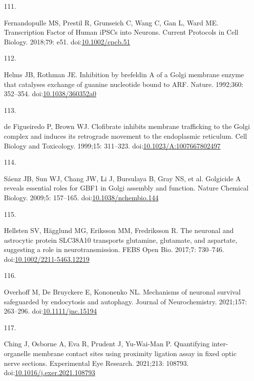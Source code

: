 \documentclass[
  12pt,
  a4paper,
]{book}
\newlength{\cslhangindent}
\newlength{\csllabelwidth}
\newlength{\cslentryspacingunit} %
\newenvironment{CSLReferences}[2] %
 {%
  \setlength{\parindent}{0pt}
  \ifodd #1
  \let\oldpar\par
  \def\par{\hangindent=\cslhangindent\oldpar}
  \fi
  \setlength{\parskip}{#2\cslentryspacingunit}
 }%
 {}
\newcommand{\CSLLeftMargin}[1]{\parbox[t]{\csllabelwidth}{#1}}
\newcommand{\CSLRightInline}[1]{\parbox[t]{\linewidth - \csllabelwidth}{#1}\break}
\begin{document}
\begin{CSLReferences}{0}{0}
\leavevmode{}%
\CSLLeftMargin{111. }%
\CSLRightInline{Fernandopulle MS, Prestil R, Grunseich C, Wang C, Gan L, Ward ME. Transcription {Factor}\textendash{{Mediated Differentiation}} of {Human iPSCs} into {Neurons}. Current Protocols in Cell Biology. 2018;79: e51. doi:\href{https://doi.org/10.1002/cpcb.51}{10.1002/cpcb.51}}

\leavevmode{}%
\CSLLeftMargin{112. }%
\CSLRightInline{Helms JB, Rothman JE. Inhibition by brefeldin {A} of a {Golgi} membrane enzyme that catalyses exchange of guanine nucleotide bound to {ARF}. Nature. 1992;360: 352--354. doi:\href{https://doi.org/10.1038/360352a0}{10.1038/360352a0}}

\leavevmode{}%
\CSLLeftMargin{113. }%
\CSLRightInline{de Figueiredo P, Brown WJ. Clofibrate inhibits membrane trafficking to the {Golgi} complex and induces its retrograde movement to the endoplasmic reticulum. Cell Biology and Toxicology. 1999;15: 311--323. doi:\href{https://doi.org/10.1023/A:1007667802497}{10.1023/A:1007667802497}}

\leavevmode{}%
\CSLLeftMargin{114. }%
\CSLRightInline{Sáenz JB, Sun WJ, Chang JW, Li J, Bursulaya B, Gray NS, et al. Golgicide {A} reveals essential roles for {GBF1} in {Golgi} assembly and function. Nature Chemical Biology. 2009;5: 157--165. doi:\href{https://doi.org/10.1038/nchembio.144}{10.1038/nchembio.144}}

\leavevmode{}%
\CSLLeftMargin{115. }%
\CSLRightInline{Hellsten SV, Hägglund MG, Eriksson MM, Fredriksson R. The neuronal and astrocytic protein {SLC38A10} transports glutamine, glutamate, and aspartate, suggesting a role in neurotransmission. FEBS Open Bio. 2017;7: 730--746. doi:\href{https://doi.org/10.1002/2211-5463.12219}{10.1002/2211-5463.12219}}

\leavevmode{}%
\CSLLeftMargin{116. }%
\CSLRightInline{Overhoff M, De Bruyckere E, Kononenko NL. Mechanisms of neuronal survival safeguarded by endocytosis and autophagy. Journal of Neurochemistry. 2021;157: 263--296. doi:\href{https://doi.org/10.1111/jnc.15194}{10.1111/jnc.15194}}

\leavevmode{}%
\CSLLeftMargin{117. }%
\CSLRightInline{Ching J, Osborne A, Eva R, Prudent J, Yu-Wai-Man P. Quantifying inter-organelle membrane contact sites using proximity ligation assay in fixed optic nerve sections. Experimental Eye Research. 2021;213: 108793. doi:\href{https://doi.org/10.1016/j.exer.2021.108793}{10.1016/j.exer.2021.108793}}

\end{CSLReferences}
\end{document}
